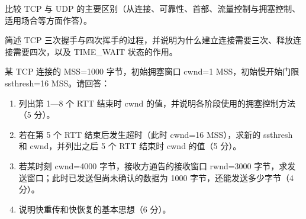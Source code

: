 \documentclass[a4paper,11pt]{article}
\begin{document}
\newpage
{}
\q 比较 TCP 与 UDP 的主要区别（从连接、可靠性、首部、流量控制与拥塞控制、适用场合等方面作答）。\anslines{5cm}

\q 简述 TCP 三次握手与四次挥手的过程，并说明为什么建立连接需要三次、释放连接需要四次，以及 TIME\_WAIT 状态的作用。\anslines{5cm}

\q 某 TCP 连接的 MSS=1000 字节，初始拥塞窗口 cwnd=1 MSS，初始慢开始门限 ssthresh=16 MSS。请回答：
\begin{enumerate}[leftmargin=2em, itemsep=1pt, topsep=2pt]
  \item 列出第 1—8 个 RTT 结束时 cwnd 的值，并说明各阶段使用的拥塞控制方法（5 分）。
  \item 若在第 5 个 RTT 结束后发生超时（此时 cwnd=16 MSS），求新的 ssthresh 和 cwnd，并列出之后 5 个 RTT 结束时 cwnd 的值（5 分）。
  \item 若某时刻 cwnd=4000 字节，接收方通告的接收窗口 rwnd=3000 字节，求发送窗口；此时已发送但尚未确认的数据为 1000 字节，还能发送多少字节（4 分）。
  \item 说明快重传和快恢复的基本思想（6 分）。
\end{enumerate}
\anslines{8cm}
\end{document}
